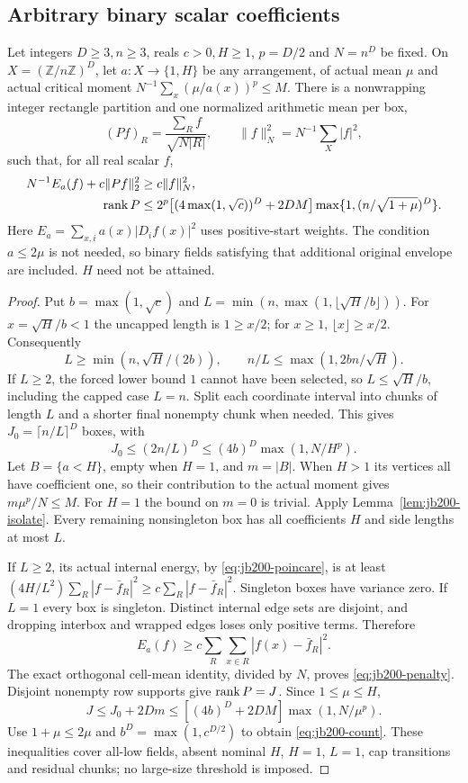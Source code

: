 \subsection{Arbitrary binary scalar coefficients}
\begin{theorem}\label{thm:jb200-binary}
Let integers $D\ge3,n\ge3$, reals $c>0,H\ge1$, $p=D/2$ and $N=n^D$
be fixed. On $X=(\mathbb Z/n\mathbb Z)^D$, let $a:X\to\{1,H\}$ be any
arrangement, of actual mean $\mu$ and actual critical moment
$N^{-1}\sum_x(\mu/a(x))^p\le M$. There is a nonwrapping integer rectangle
partition and one normalized arithmetic mean per box,
\[
 (Pf)_R=\frac{\sum_R f}{\sqrt{N|R|}},\qquad
 \|f\|_N^2=N^{-1}\sum_X|f|^2,
\]
such that, for all real scalar $f$,
\begin{align}
 N^{-1}E_a(f)+c\|Pf\|_2^2&\ge c\|f\|_N^2,\label{eq:jb200-penalty}\\
 \operatorname{rank} P&\le2^p\big[(4\max(1,\sqrt c))^D+2DM\big]
 \max\{1,(n/\sqrt{1+\mu})^D\}.\label{eq:jb200-count}
\end{align}
Here $E_a=\sum_{x,i}a(x)|D_if(x)|^2$ uses positive-start weights. The
condition $a\le2\mu$ is not needed, so binary fields satisfying that
additional original envelope are included. $H$ need not be attained.
\end{theorem}
\begin{proof}
Put $b=\max(1,\sqrt c)$ and
$L=\min(n,\max(1,\lfloor\sqrt H/b\rfloor))$. For $x=\sqrt H/b<1$ the
uncapped length is $1\ge x/2$; for $x\ge1$, $\lfloor x\rfloor\ge x/2$.
Consequently
\[
 L\ge\min(n,\sqrt H/(2b)),\qquad
 n/L\le\max(1,2bn/\sqrt H).
\]
If $L\ge2$, the forced lower bound $1$ cannot have been selected, so
$L\le\sqrt H/b$, including the capped case $L=n$.
Split each coordinate interval into chunks of length $L$ and a shorter
final nonempty chunk when needed. This gives $J_0=\lceil n/L\rceil^D$
boxes, with
\[
 J_0\le(2n/L)^D\le(4b)^D\max(1,N/H^p).
\]
Let $B=\{a<H\}$, empty when $H=1$, and $m=|B|$. When $H>1$ its
vertices all have coefficient one, so their contribution to the actual
moment gives $m\mu^p/N\le M$. For $H=1$ the bound on $m=0$ is trivial.
Apply Lemma~\ref{lem:jb200-isolate}. Every remaining nonsingleton box has
all coefficients $H$ and side lengths at most $L$.

If $L\ge2$, its actual internal energy, by
\eqref{eq:jb200-poincare}, is at least
$(4H/L^2)\sum_R|f-\bar f_R|^2\ge c\sum_R|f-\bar f_R|^2$.
Singleton boxes have variance zero. If $L=1$ every box is singleton.
Distinct internal edge sets are disjoint, and dropping interbox and
wrapped edges loses only positive terms. Therefore
\[
 E_a(f)\ge c\sum_R\sum_{x\in R}|f(x)-\bar f_R|^2.
\]
The exact orthogonal cell-mean identity, divided by $N$, proves
\eqref{eq:jb200-penalty}. Disjoint nonempty row supports give $\operatorname{rank} P=J$.
Since $1\le\mu\le H$,
\[
 J\le J_0+2Dm\le[(4b)^D+2DM]\max(1,N/\mu^p).
\]
Use $1+\mu\le2\mu$ and $b^D=\max(1,c^{D/2})$ to obtain
\eqref{eq:jb200-count}. These inequalities cover all-low fields, absent
nominal $H$, $H=1$, $L=1$, cap transitions and residual chunks; no
large-size threshold is imposed.
\end{proof}
